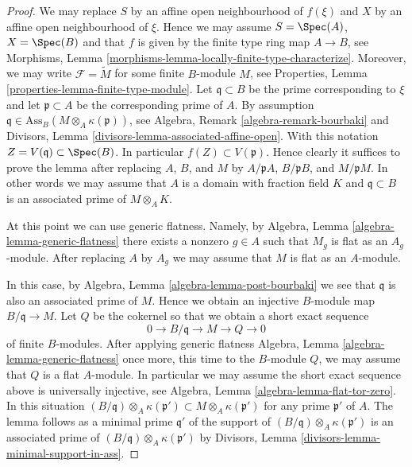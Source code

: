 \begin{proof}
We may replace $S$ by an affine open neighbourhood of $f(\xi)$
and $X$ by an affine open neighbourhood of $\xi$. Hence we may assume
$S = \Spec(A)$, $X = \Spec(B)$ and that $f$ is given by
the finite type ring map $A \to B$, see
Morphisms, Lemma \ref{morphisms-lemma-locally-finite-type-characterize}.
Moreover, we may write $\mathcal{F} = \widetilde{M}$ for some finite
$B$-module $M$, see
Properties, Lemma \ref{properties-lemma-finite-type-module}.
Let $\mathfrak q \subset B$ be the prime corresponding to $\xi$ and
let $\mathfrak p \subset A$ be the corresponding prime of $A$.
By assumption $\mathfrak q \in \text{Ass}_B(M \otimes_A \kappa(\mathfrak p))$,
see
Algebra, Remark \ref{algebra-remark-bourbaki}
and
Divisors, Lemma \ref{divisors-lemma-associated-affine-open}.
With this notation $Z = V(\mathfrak q) \subset \Spec(B)$.
In particular $f(Z) \subset V(\mathfrak p)$. Hence clearly it suffices to
prove the lemma after replacing $A$, $B$, and $M$ by
$A/\mathfrak pA$, $B/\mathfrak pB$, and $M/\mathfrak pM$.
In other words we may assume that $A$ is a domain with fraction field
$K$ and $\mathfrak q \subset B$ is an associated prime of $M \otimes_A K$.

\medskip\noindent
At this point we can use generic flatness. Namely, by
Algebra, Lemma \ref{algebra-lemma-generic-flatness}
there exists a nonzero $g \in A$ such that $M_g$ is flat
as an $A_g$-module. After replacing $A$ by $A_g$ we may assume that
$M$ is flat as an $A$-module.

\medskip\noindent
In this case, by
Algebra, Lemma \ref{algebra-lemma-post-bourbaki}
we see that $\mathfrak q$ is also an associated prime of $M$.
Hence we obtain an injective $B$-module map $B/\mathfrak q \to M$.
Let $Q$ be the cokernel so that we obtain a short exact sequence
$$
0 \to B/\mathfrak q \to M \to Q \to 0
$$
of finite $B$-modules. After applying generic flatness
Algebra, Lemma \ref{algebra-lemma-generic-flatness}
once more, this time to the $B$-module $Q$, we may assume that $Q$
is a flat $A$-module. In particular we may assume the short exact
sequence above is universally injective, see
Algebra, Lemma \ref{algebra-lemma-flat-tor-zero}.
In this situation
$(B/\mathfrak q) \otimes_A \kappa(\mathfrak p')
\subset M \otimes_A \kappa(\mathfrak p')$
for any prime $\mathfrak p'$ of $A$. The lemma follows as a minimal
prime $\mathfrak q'$ of the support of
$(B/\mathfrak q) \otimes_A \kappa(\mathfrak p')$
is an associated prime of $(B/\mathfrak q) \otimes_A \kappa(\mathfrak p')$ by
Divisors, Lemma \ref{divisors-lemma-minimal-support-in-ass}.
\end{proof}

